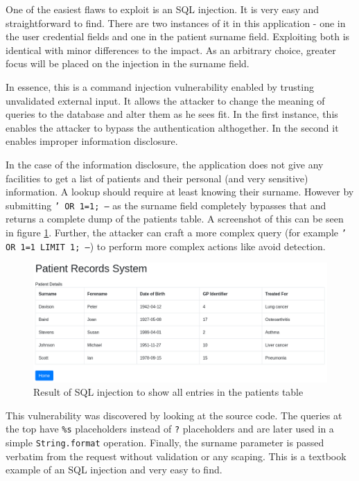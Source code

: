 \documentclass[10pt]{article}
\begin{document}
            One of the easiest flaws to exploit is an SQL injection. It is very
            easy and straightforward to find. There are two instances of it in
            this application - one in the user credential fields and one in the
            patient surname field. Exploiting both is identical with minor
            differences to the impact. As an arbitrary choice, greater focus
            will be placed on the injection in the surname field.

            In essence, this is a command injection vulnerability enabled by
            trusting unvalidated external input. It allows the attacker to
            change the meaning of queries to the database and alter them as he
            sees fit. In the first instance, this enables the attacker to
            bypass the authentication althogether. In the second it enables
            improper information disclosure.

            In the case of the information disclosure, the application does not
            give any facilities to get a list of patients and their personal
            (and very sensitive) information. A lookup should require at least
            knowing their surname. However by submitting \texttt{' OR 1=1; --}
            as the surname field completely bypasses that and returns a
            complete dump of the patients table. A screenshot of this can be
            seen in figure \ref{injection}. Further, the attacker can craft a
            more complex query (for example \texttt{' OR 1=1 LIMIT 1; --}) to
            perform more complex actions like avoid detection.

            \begin{figure}[h!]
                \includegraphics[width=\textwidth]{injection}
                \caption{Result of SQL injection to show all entries in the patients table}
                \label{injection}
            \end{figure}

            This vulnerability was discovered by looking at the source code.
            The queries at the top have \texttt{\%s} placeholders instead of
            \texttt{?} placeholders and are later used in a simple
            \texttt{String.format} operation. Finally, the surname parameter is
            passed verbatim from the request without validation or any scaping.
            This is a textbook example of an SQL injection and very easy to
            find.
\end{document}
